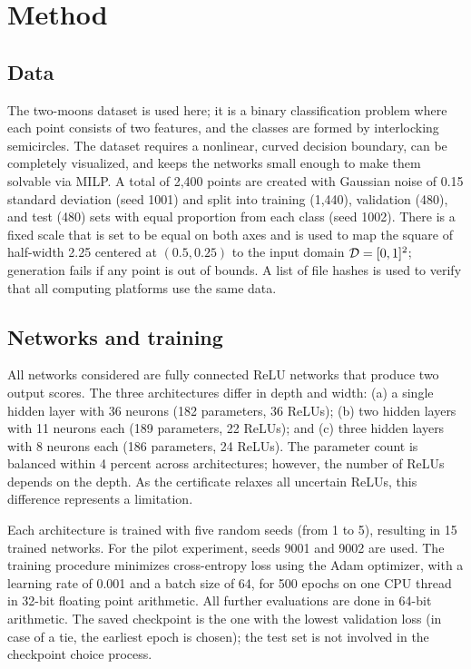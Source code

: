 \section{Method}
\label{sec:method}

\subsection{Data}
\label{sec:method-data}

The two-moons dataset is used here; it is a binary classification problem where each
point consists of two features, and the classes are formed by
interlocking semicircles. The dataset requires a nonlinear, curved decision
boundary, can be completely visualized, and keeps the networks small enough to
make them solvable via MILP. A total of 2,400
points are created with Gaussian noise of 0.15 standard deviation (seed 1001) and
split into training (1,440), validation (480), and test (480) sets with equal proportion from each
class (seed 1002). There is a fixed scale that is set to be equal on both axes and is used to map
the square of half-width 2.25 centered at $(0.5, 0.25)$ to the input domain
$\mathcal{D} = [0,1]^2$; generation fails if any point is out of bounds. A list of file
hashes is used to verify that all computing platforms use the same data.

\subsection{Networks and training}
\label{sec:method-networks}

All networks considered are fully connected ReLU networks that produce two output scores. The
three architectures differ in depth and width: (a) a single hidden layer with 36
neurons (182 parameters, 36 ReLUs); (b) two hidden layers with 11 neurons each (189 parameters, 22
ReLUs); and (c) three hidden layers with 8 neurons each (186 parameters, 24 ReLUs). The parameter
count is balanced within 4 percent across architectures; however,
the number of ReLUs depends on the depth. As the certificate relaxes all uncertain
ReLUs, this difference represents a limitation.

Each architecture is trained with five random seeds (from 1 to 5), resulting in 15
trained networks. For the pilot experiment, seeds 9001 and 9002 are used. The training procedure
minimizes cross-entropy loss using the Adam optimizer, with a learning rate of
0.001 and a batch size of 64, for 500 epochs on one CPU thread in 32-bit floating point arithmetic.
All further evaluations are done in 64-bit arithmetic. The saved checkpoint is the one with the
lowest validation loss (in case of a tie, the earliest epoch is chosen); the test set is not
involved in the checkpoint choice process.

